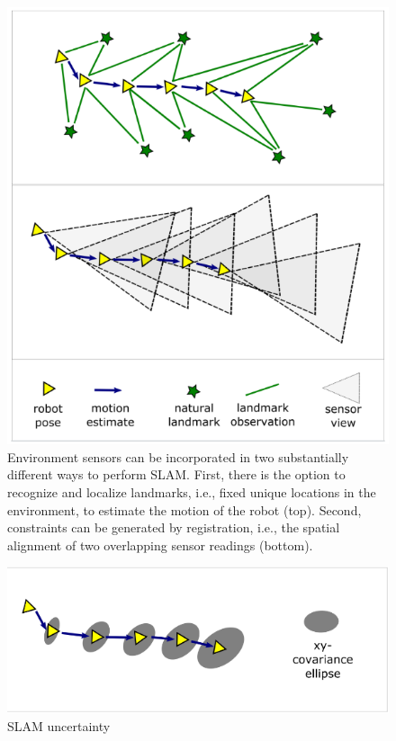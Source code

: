 \documentclass{article}
\begin{document}
\begin{figure}[H]
    \centering
    \includegraphics{image/Triangle.png}
    \caption{Environment sensors can be incorporated in two substantially different ways to perform SLAM. 
    First, there is  the  option  to  recognize  and  localize  landmarks,  i.e.,  fixed  unique  locations  in  the  environment,  to  estimate  the motion of the robot (top).  Second,  constraints can be generated by registration,  i.e.,  the spatial alignment of two overlapping sensor readings (bottom).}
    \label{fig:Triangle}
\end{figure}


\begin{figure}[H]
    \centering
    \includegraphics{image/Rond.PNG}
    \caption{SLAM uncertainty}
    \label{fig:Rond}
\end{figure}
\end{document}
